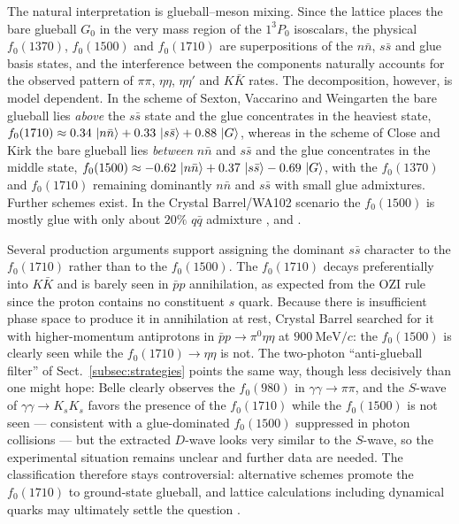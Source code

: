 The natural interpretation is glueball--meson mixing. Since the lattice places
the bare glueball $G_0$ in the very mass region of the $1^3P_0$ isoscalars, the
physical $f_0(1370)$, $f_0(1500)$ and $f_0(1710)$ are superpositions of the
$n\bar n$, $s\bar s$ and glue basis states, and the interference between the
components naturally accounts for the observed pattern of $\pi\pi$, $\eta\eta$,
$\eta\eta'$ and $K\bar K$ rates. The decomposition, however, is model dependent.
In the scheme of Sexton, Vaccarino and Weingarten the bare glueball lies
\emph{above} the $s\bar s$ state and the glue concentrates in the heaviest
state, $f_0(1710) \approx 0.34\,\ket{n\bar n} + 0.33\,\ket{s\bar s} +
0.88\,\ket{G}$, whereas in the scheme of Close and Kirk the bare glueball lies
\emph{between} $n\bar n$ and $s\bar s$ and the glue concentrates in the middle
state, $f_0(1500) \approx -0.62\,\ket{n\bar n} + 0.37\,\ket{s\bar s} -
0.69\,\ket{G}$, with the $f_0(1370)$ and $f_0(1710)$ remaining dominantly
$n\bar n$ and $s\bar s$ with small glue admixtures. Further schemes exist. In the
Crystal Barrel/WA102 scenario the $f_0(1500)$ is mostly glue with only about
$20\%$ $q\bar q$ admixture \cite{Sexton:1995kd}, \cite{Close:2001ga} and
\cite[Ch.~11]{Amsler2018}.

Several production arguments support assigning the dominant $s\bar s$ character
to the $f_0(1710)$ rather than to the $f_0(1500)$. The $f_0(1710)$ decays
preferentially into $K\bar K$ and is barely seen in $\bar p p$ annihilation,
as expected from the OZI rule since the proton contains no constituent $s$
quark. Because there is insufficient phase space to produce it in annihilation at
rest, Crystal Barrel searched for it with higher-momentum antiprotons in
$\bar p p\to\pi^0\eta\eta$ at $900~\mathrm{MeV}/c$: the $f_0(1500)$ is clearly
seen while the $f_0(1710)\to\eta\eta$ is not. The two-photon ``anti-glueball
filter'' of Sect.~\ref{subsec:strategies} points the same way, though less
decisively than one might hope: Belle clearly observes the $f_0(980)$ in
$\gamma\gamma\to\pi\pi$, and the $S$-wave of $\gamma\gamma\to K_sK_s$ favors the
presence of the $f_0(1710)$ while the $f_0(1500)$ is not seen --- consistent with
a glue-dominated $f_0(1500)$ suppressed in photon collisions --- but the
extracted $D$-wave looks very similar to the $S$-wave, so the experimental
situation remains unclear and further data are needed. The classification
therefore stays controversial: alternative schemes promote the $f_0(1710)$ to
ground-state glueball, and lattice calculations including dynamical quarks may
ultimately settle the question \cite[Ch.~11]{Amsler2018}.

